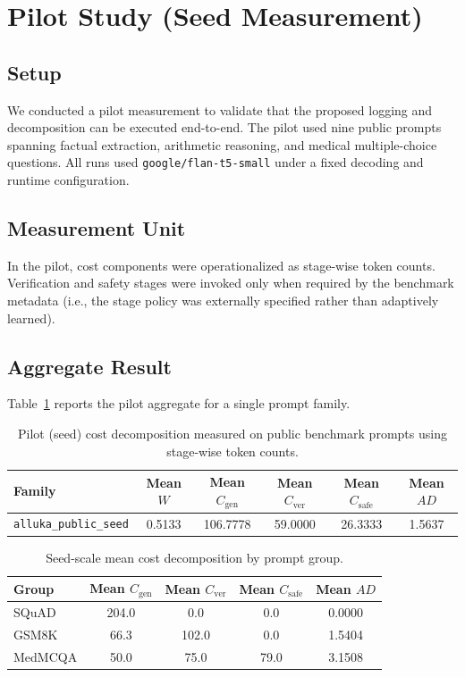 \documentclass{svjour3}
\begin{document}
\section{Pilot Study (Seed Measurement)}
\subsection{Setup}
We conducted a pilot measurement to validate that the proposed logging and decomposition can be executed end-to-end. The pilot used nine public prompts spanning factual extraction, arithmetic reasoning, and medical multiple-choice questions. All runs used \texttt{google/flan-t5-small} under a fixed decoding and runtime configuration.

\subsection{Measurement Unit}
In the pilot, cost components were operationalized as stage-wise token counts. Verification and safety stages were invoked only when required by the benchmark metadata (i.e., the stage policy was externally specified rather than adaptively learned).

\subsection{Aggregate Result}
Table~\ref{tab:alluka-seed} reports the pilot aggregate for a single prompt family.
\begin{table}[t]
\centering
\small
\begin{tabular}{lccccc}
\toprule
Family & Mean $W$ & Mean $C_{\text{gen}}$ & Mean $C_{\text{ver}}$ & Mean $C_{\text{safe}}$ & Mean $AD$ \\
\midrule
\texttt{alluka\_public\_seed} & 0.5133 & 106.7778 & 59.0000 & 26.3333 & 1.5637 \\
\bottomrule
\end{tabular}
\caption{Pilot (seed) cost decomposition measured on public benchmark prompts using stage-wise token counts.}
\label{tab:alluka-seed}
\end{table}



\begin{table}[t]
\centering
\small
\caption{Seed-scale mean cost decomposition by prompt group.}
\label{tab:alluka-groups}
\begin{tabular}{lcccc}
\toprule
Group & Mean $C_{\text{gen}}$ & Mean $C_{\text{ver}}$ & Mean $C_{\text{safe}}$ & Mean $AD$ \\
\midrule
SQuAD & 204.0 & 0.0 & 0.0 & 0.0000 \\
GSM8K & 66.3 & 102.0 & 0.0 & 1.5404 \\
MedMCQA & 50.0 & 75.0 & 79.0 & 3.1508 \\
\bottomrule
\end{tabular}
\end{table}
\end{document}
